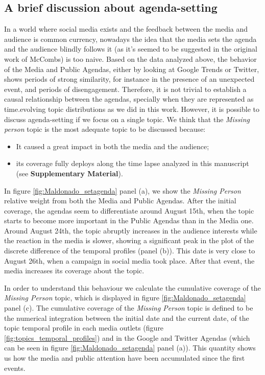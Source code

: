 \documentclass{bmcart}
\begin{document}
\subsection*{A brief discussion about agenda-setting}
\label{sec:who_sets}

\par In a world where social media exists and the feedback between the media and audience is common currency, nowadays the idea that the media sets the agenda and the audience blindly follows it (as it's seemed to be suggested in the original work of McCombs) is too naive. Based on the data analyzed above, the behavior of the Media and Public Agendas, either by looking at Google Trends or Twitter, shows periods of strong similarity, for instance in the presence of an unexpected event, and periods of disengagement. 
Therefore, it is not trivial to establish a causal relationship between the agendas, specially when they are represented as time.evolving topic distributions as we did in this work. 
However, it is possible to discuss agenda-setting if we focus on a single topic.
 We think that the \emph{Missing person} topic is the most adequate topic to be discussed because:
\begin{itemize} 
\item It caused a great impact in both the media and the audience;
\item  its coverage fully deploys along the time lapse analyzed in this manuscript (see \textbf{Supplementary Material}).
\end{itemize}

\par In figure \ref{fig:Maldonado_setagenda} panel (a), we show the \emph{Missing Person} relative weight from both the Media and Public Agendas. 
After the initial coverage, the agendas seem to differentiate around August 15th, when the topic starts to become more important in the Public Agendas than in the Media one. 
Around August 24th, the topic abruptly increases in the audience interests while the reaction in the media is slower, showing a significant peak in the plot of the discrete difference of the temporal profiles (panel (b)). This date is very close to August 26th, when a campaign in social media took place. After that event, the media increases its coverage about the topic. 

In order to understand this behaviour we calculate the cumulative coverage of the \emph{Missing Person} topic, which is displayed in figure \ref{fig:Maldonado_setagenda} panel (c).
The cumulative coverage of the \emph{Missing Person} topic is defined to be the numerical integration between the initial date and the current date, of the topic temporal profile in each media outlets (figure \ref{fig:topics_temporal_profiles}) and in the Google and Twitter Agendas (which can be seen in figure \ref{fig:Maldonado_setagenda} panel (a)). 
This quantity shows us how the media and public attention have been accumulated since the first events.
\end{document}
